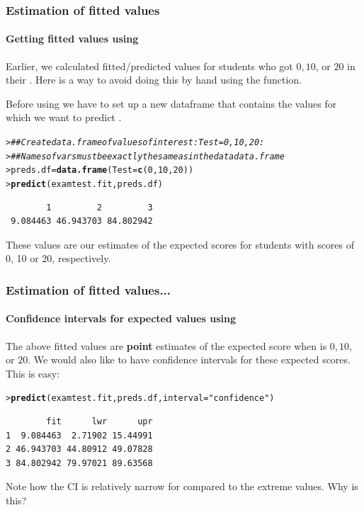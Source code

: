 \documentclass{beamer}\usepackage[]{graphicx}\usepackage[]{xcolor}
\makeatletter
\newcommand{\hlnum}[1]{\textcolor[rgb]{0.686,0.059,0.569}{#1}}%
\newcommand{\hlstr}[1]{\textcolor[rgb]{0.192,0.494,0.8}{#1}}%
\newcommand{\hlcom}[1]{\textcolor[rgb]{0.678,0.584,0.686}{\textit{#1}}}%
\newcommand{\hlstd}[1]{\textcolor[rgb]{0.345,0.345,0.345}{#1}}%
\newcommand{\hlkwb}[1]{\textcolor[rgb]{0.69,0.353,0.396}{#1}}%
\newcommand{\hlkwc}[1]{\textcolor[rgb]{0.333,0.667,0.333}{#1}}%
\newcommand{\hlkwd}[1]{\textcolor[rgb]{0.737,0.353,0.396}{\textbf{#1}}}%
\newenvironment{kframe}{%
 \def\at@end@of@kframe{}%
 \ifinner\ifhmode%
  \def\at@end@of@kframe{\end{minipage}}%
  \begin{minipage}{\columnwidth}%
 \fi\fi%
 \def\FrameCommand##1{\hskip\@totalleftmargin \hskip-\fboxsep
 \colorbox{shadecolor}{##1}\hskip-\fboxsep
     \hskip-\linewidth \hskip-\@totalleftmargin \hskip\columnwidth}%
 \MakeFramed {\advance\hsize-\width
   \@totalleftmargin\z@ \linewidth\hsize
   \@setminipage}}%
 {\par\unskip\endMakeFramed%
 \at@end@of@kframe}
\newenvironment{knitrout}{}{} %
\makeatother
\begin{document}
\begin{frame}[fragile]
\frametitle{Estimation of fitted values}
\framesubtitle{Getting fitted values using }

Earlier, we calculated fitted/predicted values for students who got $0,10$, or $20$ in their .
Here is a way to avoid doing this by hand using the  function.

Before using  we have to set up a new dataframe that contains 
the  values for which we want to predict .

\begin{knitrout}\scriptsize
{}\color{fgcolor}\begin{kframe}
\begin{alltt}
\hlstd{> }\hlcom{## Create data.frame of values of interest: Test = 0, 10, 20:}
\hlstd{> }\hlcom{## Names of vars must be exactly the same as in the data data.frame}
\hlstd{> }\hlstd{preds.df}\hlkwb{=}\hlkwd{data.frame}\hlstd{(}\hlkwc{Test}\hlstd{=}\hlkwd{c}\hlstd{(}\hlnum{0}\hlstd{,}\hlnum{10}\hlstd{,}\hlnum{20}\hlstd{))}
\hlstd{> }\hlkwd{predict}\hlstd{(examtest.fit, preds.df)}
\end{alltt}
\begin{verbatim}
        1         2         3 
 9.084463 46.943703 84.802942 
\end{verbatim}
\end{kframe}
\end{knitrout}

These values are our estimates of the expected  scores for 
students with  scores of 0, 10 or 20, respectively.

\end{frame}

\begin{frame}[fragile]
\frametitle{Estimation of fitted values...}
\framesubtitle{Confidence intervals for expected values using }
The above fitted values are {\bf point} estimates of the expected  score when  is $0,10$, or $20$.  We would also like to have confidence intervals for these expected scores.
This is easy: 

\begin{knitrout}\scriptsize
{}\color{fgcolor}\begin{kframe}
\begin{alltt}
\hlstd{> }\hlkwd{predict}\hlstd{(examtest.fit, preds.df,} \hlkwc{interval}\hlstd{=}\hlstr{"confidence"}\hlstd{)}
\end{alltt}
\begin{verbatim}
        fit      lwr      upr
1  9.084463  2.71902 15.44991
2 46.943703 44.80912 49.07828
3 84.802942 79.97021 89.63568
\end{verbatim}
\end{kframe}
\end{knitrout}

Note how the CI is relatively narrow for  compared to the extreme  values. Why is this?

\end{frame}
\end{document}
